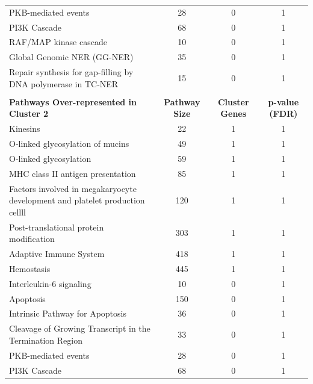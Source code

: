 \begin{table}[!hp]
{\begin{tabular}{lccc}
  \rowcolor{Cluster_Blue!15}
  PKB-mediated events &  28 &   0 &   1 \\ 
  \rowcolor{Cluster_Blue!20}
  PI3K Cascade &  68 &   0 &   1 \\ 
  \rowcolor{Cluster_Blue!15}
  RAF/MAP kinase cascade &  10 &   0 &   1 \\ 
  \rowcolor{Cluster_Blue!20}
  Global Genomic NER (GG-NER) &  35 &   0 &   1 \\ 
  \rowcolor{Cluster_Blue!15}
  Repair synthesis for gap-filling by DNA polymerase in TC-NER &  15 &   0 &   1 \\ 
  \hline
  \\
  \cellcolor{white} \large{\textbf{Pathways Over-represented in Cluster 2}} & \large{\textbf{Pathway Size}} & \large{\textbf{Cluster Genes}} & \large{\textbf{p-value (FDR)}} \\ %
  \hline
  \rowcolor{Cluster_Green!30}
  Kinesins &  22 &   1 &   1 \\ 
  \rowcolor{Cluster_Green!20}
  O-linked glycosylation of mucins &  49 &   1 &   1 \\ 
  \rowcolor{Cluster_Green!30}
  O-linked glycosylation &  59 &   1 &   1 \\ 
  \rowcolor{Cluster_Green!20}
  MHC class II antigen presentation &  85 &   1 &   1 \\ 
  \rowcolor{Cluster_Green!30}
  Factors involved in megakaryocyte development and platelet production \textcolor{Cluster_Green!30} {cellll} & 120 &   1 &   1 \\
  \rowcolor{Cluster_Green!20}
  Post-translational protein modification & 303 &   1 &   1 \\ 
  \rowcolor{Cluster_Green!30}
  Adaptive Immune System & 418 &   1 &   1 \\ 
  \rowcolor{Cluster_Green!20}
  Hemostasis & 445 &   1 &   1 \\ 
  \rowcolor{Cluster_Green!30}
  Interleukin-6 signaling &  10 &   0 &   1 \\ 
  \rowcolor{Cluster_Green!20}
  Apoptosis & 150 &   0 &   1 \\ 
  \rowcolor{Cluster_Green!30}
  Intrinsic Pathway for Apoptosis &  36 &   0 &   1 \\ 
  \rowcolor{Cluster_Green!20}
  Cleavage of Growing Transcript in the Termination Region &  33 &   0 &   1 \\ 
  \rowcolor{Cluster_Green!30}
  PKB-mediated events &  28 &   0 &   1 \\ 
  \rowcolor{Cluster_Green!20}
  PI3K Cascade &  68 &   0 &   1 \\ 

\end{tabular}}
\end{table}
